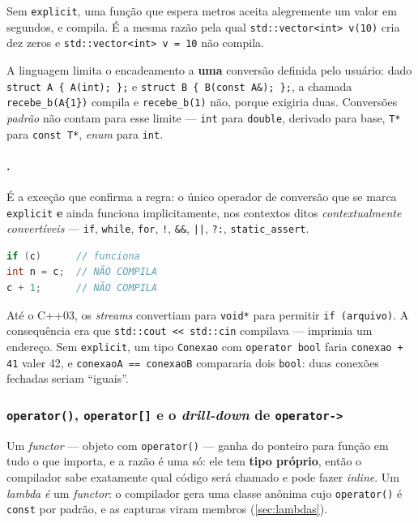 Sem \texttt{explicit}, uma função que espera metros aceita alegremente um valor
em segundos, e compila. É a mesma razão pela qual
\texttt{std::vector<int> v(10)} cria dez zeros e \texttt{std::vector<int> v = 10}
não compila.

A linguagem limita o encadeamento a \textbf{uma} conversão definida pelo
usuário: dado \texttt{struct A \{ A(int); \};} e \texttt{struct B \{ B(const
A\&); \};}, a chamada \texttt{recebe\_b(A\{1\})} compila e
\texttt{recebe\_b(1)} não, porque exigiria duas. Conversões \emph{padrão} não
contam para esse limite --- \texttt{int} para \texttt{double}, derivado para
base, \texttt{T*} para \texttt{const T*}, \emph{enum} para \texttt{int}.

\paragraph{.} É a exceção que confirma a regra:
o único operador de conversão que se marca \texttt{explicit} \textbf{e} ainda
funciona implicitamente, nos contextos ditos \emph{contextualmente
convertíveis} --- \texttt{if}, \texttt{while}, \texttt{for}, \texttt{!},
\texttt{\&\&}, \texttt{||}, \texttt{?:}, \texttt{static\_assert}.

\begin{lstlisting}[style=bt, language=C++,
    caption={O que \texttt{explicit} impede sem impedir o uso pretendido.}]
if (c)      // funciona
int n = c;  // NÃO COMPILA
c + 1;      // NÃO COMPILA
\end{lstlisting}

\begin{porque}
Até o C++03, os \emph{streams} convertiam para \texttt{void*} para permitir
\texttt{if (arquivo)}. A consequência era que \texttt{std::cout << std::cin}
compilava --- imprimia um endereço. Sem \texttt{explicit}, um tipo
\texttt{Conexao} com \texttt{operator bool} faria \texttt{conexao + 41} valer 42,
e \texttt{conexaoA == conexaoB} compararia dois \texttt{bool}: duas conexões
fechadas seriam ``iguais''.
\end{porque}

\subsubsection{\texttt{operator()}, \texttt{operator[]} e o \emph{drill-down} de \texttt{operator->}}

Um \emph{functor} --- objeto com \texttt{operator()} --- ganha do ponteiro para
função em tudo o que importa, e a razão é uma só: ele tem \textbf{tipo próprio},
então o compilador sabe exatamente qual código será chamado e pode fazer
\emph{inline}. Um \emph{lambda} \emph{é} um \emph{functor}: o compilador gera
uma classe anônima cujo \texttt{operator()} é \texttt{const} por padrão, e as
capturas viram membros (\cref{sec:lambdas}).

